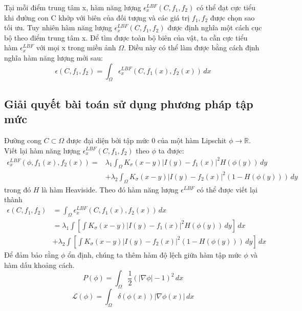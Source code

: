 \documentclass[12pt, oneside, a4]{book}
\begin{document}
Tại mỗi điểm trung tâm x, hàm năng lượng $\epsilon_x^{LBF}(C,f_1, f_2)$   có thể đạt cực tiểu khi đường con C khớp với biên của đối tượng và các giá trị $f_1, f_2$ được chọn sao tối ưu. Tuy nhiên hàm năng lượng $\epsilon_x^{LBF}(C,f_1, f_2)$ được định nghĩa một cách cục bộ theo điểm trung tâm x. Để tìm được toàn bộ biên của vật, ta cần cực tiểu hàm $\epsilon_x^{LBF}$  với mọi x trong miền ảnh $\Omega$. Điều này có thể làm được bằng cách định nghĩa hàm năng lượng mới sau:
\begin{equation}
\epsilon(C, f_1, f_2)=\int_{\Omega} \epsilon_x^{LBF}(C, f_1(x), f_2(x))\,dx
\end{equation}
\subsection{Giải quyết bài toán sử dụng phương pháp tập mức}
Đường cong $C \subset \Omega$ được đại diện bởi tập mức 0 của một hàm Lipschit $\phi \rightarrow \mathbb{R}$. Viết lại hàm năng lượng $\epsilon_x^{LBF}(C,f_1, f_2)$ theo $\phi$ ta được:
\begin{equation*}
\begin{split}
\epsilon_x^{LBF}(\phi, f_1(x), f_2(x))
=&\lambda_1 \int_{\Omega} K_{\sigma}(x-y)|I(y)-f_1(x)|^2H(\phi(y))\,dy\\ &+ \lambda_2 \int_{\Omega} K_{\sigma}(x-y)|I(y)-f_2(x)|^2(1-H(\phi(y)))\,dy 
\end{split}
\end{equation*}
trong đó $H$ là hàm Heaviside. Theo đó hàm năng lượng $\epsilon^{LBF}$ có thể được viết lại thành
\begin{equation*}
\begin{split}
\epsilon(C, f_1, f_2)&=\int_{\Omega} \epsilon_x^{LBF}(C, f_1(x), f_2(x))\,dx\\
&=\lambda_1 \int[\int K_{\sigma}(x-y)|I(y)-f_1(x)|^2H(\phi(y))\,dy]\,dx \\
&+ \lambda_2 \int[\int K_{\sigma}(x-y)|I(y)-f_2(x)|^2(1-H(\phi(y)))\,dy ]\,dx
\end{split}
\end{equation*}
Để đảm bảo rằng $\phi$ ổn định, chúng ta thêm hàm độ lệch giữa hàm tập mức $\phi$ và hàm dấu khoảng cách.
\begin{equation*}
P(\phi)= \int_{\Omega}\dfrac{1}{2}(|\nabla \phi|-1)^2\,dx
\end{equation*}
\begin{equation*}
\mathcal{L}(\phi)=\int_{\Omega}\delta(\phi(x))|\nabla \phi(x)|\,dx
\end{equation*}
\end{document}
